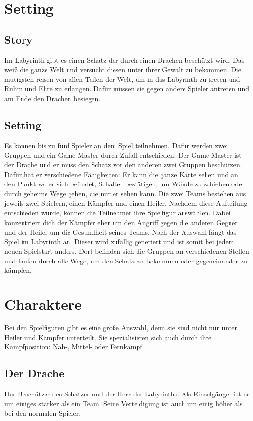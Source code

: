 \documentclass[10pt]{book}
\begin{document}
	\chapter{Setting}
	\section{Story}
	Im Labyrinth gibt es einen Schatz der durch einen Drachen beschützt wird. Das weiß die ganze Welt und versucht diesen unter ihrer Gewalt zu bekommen. Die mutigsten reisen von allen Teilen der Welt, um in das Labyrinth zu treten und Ruhm und Ehre zu erlangen. Dafür müssen sie gegen andere Spieler antreten und am Ende den Drachen besiegen.
	\section{Setting}
	Es können bis zu fünf Spieler an dem Spiel teilnehmen. Dafür werden zwei Gruppen und ein Game Master durch Zufall entschieden.
	Der Game Master ist der Drache und er muss den Schatz vor den anderen zwei Gruppen beschützen. Dafür hat er verschiedene Fähigkeiten: Er kann die ganze Karte sehen und an den Punkt wo er sich befindet, Schalter bestätigen, um Wände zu schieben oder durch geheime Wege gehen, die nur er sehen kann.
	Die zwei Teams bestehen aus jeweils zwei Spielern, einen Kämpfer und einen Heiler. Nachdem diese Aufteilung entschieden wurde, können die Teilnehmer ihre Spielfigur auswählen. Dabei konzentriert dich der Kämpfer eher um den Angriff gegen die anderen Gegner und der Heiler um die Gesundheit seines Teams.
	Nach der Auswahl fängt das Spiel im Labyrinth an. 
	Dieser wird zufällig generiert und ist somit bei jedem neuen Spielstart anders. Dort befinden sich die Gruppen an verschiedenen Stellen und laufen durch alle Wege, um den Schatz zu bekommen oder gegeneinander zu kämpfen.
	\chapter{Charaktere}
	Bei den Spielfiguren gibt es eine große Auswahl, denn sie sind nicht nur unter Heiler und Kämpfer unterteilt. Sie spezialisieren sich auch durch ihre Kampfposition: Nah-, Mittel- oder Fernkampf.
	\section{Der Drache} 
	Der Beschützer des Schatzes und der Herr des Labyrinths. Als Einzelgänger ist er um einiges stärker als ein Team. Seine Verteidigung ist auch um einig höher als bei den normalen Spieler.
\end{document}
